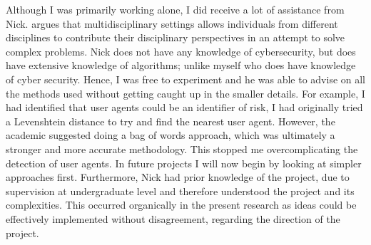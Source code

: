 Although I was primarily working alone, I did receive a lot of assistance from Nick. \cite{thurow1999dynamics} argues that multidisciplinary settings allows individuals from different disciplines to contribute their disciplinary perspectives in an attempt to solve complex problems. Nick does not have any knowledge of cybersecurity, but does have extensive knowledge of algorithms; unlike myself who does have knowledge of cyber security. Hence, I was free to experiment and he was able to advise on all the methods used without getting caught up in the smaller details. For example, I had identified that user agents could be an identifier of risk, I had originally tried a Levenshtein distance to try and find the nearest user agent. However, the academic suggested doing a bag of words approach, which was ultimately a stronger and more accurate methodology. This stopped me overcomplicating the detection of user agents. In future projects I will now begin by looking at simpler approaches first. Furthermore, Nick had prior knowledge of the project, due to supervision at undergraduate level and therefore understood the project and its complexities. This occurred organically in the present research as ideas could be effectively implemented without disagreement, regarding the direction of the project. 



